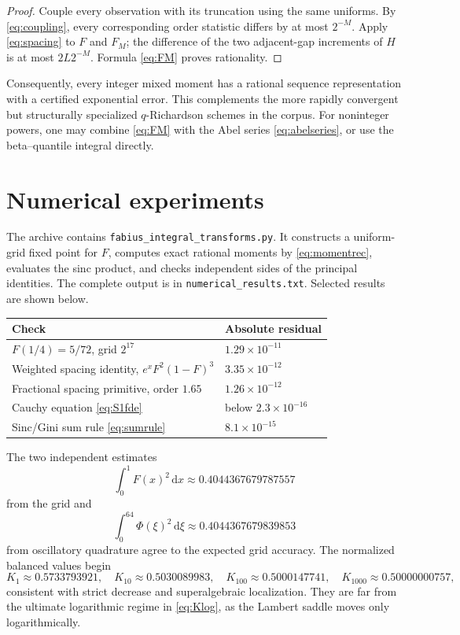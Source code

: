 \documentclass[11pt,oneside]{article}
\theoremstyle{definition}
\theoremstyle{remark}
\newcommand{\F}{F}
\newcommand{\dd}{\,\mathrm d}
\begin{document}
\begin{proof}
Couple every observation with its truncation using the same uniforms.  By
\eqref{eq:coupling}, every corresponding order statistic differs by at most
\(2^{-M}\).  Apply \eqref{eq:spacing} to \(\F\) and \(\F_M\); the difference of
the two adjacent-gap increments of \(H\) is at most \(2L2^{-M}\).  Formula
\eqref{eq:FM} proves rationality.
\end{proof}

Consequently, every integer mixed moment has a rational sequence representation
with a certified exponential error.  This complements the more rapidly
convergent but structurally specialized \(q\)-Richardson schemes in the corpus.
For noninteger powers, one may combine \eqref{eq:FM} with the Abel series
\eqref{eq:abelseries}, or use the beta--quantile integral directly.

\section{Numerical experiments}

The archive contains \texttt{fabius\_integral\_transforms.py}.  It constructs a
uniform-grid fixed point for \(\F\), computes exact rational moments by
\eqref{eq:momentrec}, evaluates the sinc product, and checks independent sides
of the principal identities.  The complete output is in
\texttt{numerical\_results.txt}.  Selected results are shown below.

\begin{center}
\begin{tabular}{@{}ll@{}}
\toprule
Check & Absolute residual \\
\midrule
\(\F(1/4)=5/72\), grid \(2^{17}\) & \(1.29\times10^{-11}\) \\
Weighted spacing identity, \(e^x\F^2(1-\F)^3\) & \(3.35\times10^{-12}\) \\
Fractional spacing primitive, order \(1.65\) & \(1.26\times10^{-12}\) \\
Cauchy equation \eqref{eq:S1fde} & below \(2.3\times10^{-16}\) \\
Sinc/Gini sum rule \eqref{eq:sumrule} & \(8.1\times10^{-15}\) \\
\bottomrule
\end{tabular}
\end{center}

The two independent estimates
\[
 \int_0^1\F(x)^2\dd x\approx0.4044367679787557
\]
from the grid and
\[
 \int_0^{64}\Phi(\xi)^2\dd\xi
 \approx0.4044367679839853
\]
from oscillatory quadrature agree to the expected grid accuracy.  The normalized
balanced values begin
\[
 K_1\approx0.5733793921,
 \quad K_{10}\approx0.5030089983,
 \quad K_{100}\approx0.5000147741,
 \quad K_{1000}\approx0.50000000757,
\]
consistent with strict decrease and superalgebraic localization.  They are far
from the ultimate logarithmic regime in \eqref{eq:Klog}, as the Lambert saddle
moves only logarithmically.
\end{document}

